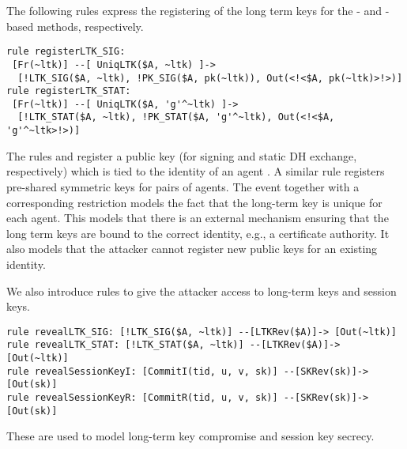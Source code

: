 The following rules express the registering of the long term keys for the
\mSig{}- and \mStat{}-based methods, respectively.
%
\begin{lstlisting}
rule registerLTK_SIG:
 [Fr(~ltk)] --[ UniqLTK($A, ~ltk) ]->
  [!LTK_SIG($A, ~ltk), !PK_SIG($A, pk(~ltk)), Out(<!<$A, pk(~ltk)>!>)]
rule registerLTK_STAT:
 [Fr(~ltk)] --[ UniqLTK($A, 'g'^~ltk) ]->
  [!LTK_STAT($A, ~ltk), !PK_STAT($A, 'g'^~ltk), Out(<!<$A, 'g'^~ltk>!>)]
\end{lstlisting}
%
The rules  and  register a public key
(for signing and static DH exchange, respectively) which is tied to the
identity of an agent .
%
A similar rule  registers pre-shared symmetric keys for
pairs of agents.
%
The event  together with a corresponding restriction models the fact that
the long-term key is unique for each agent.
This models that there is an external mechanism ensuring that the
long term keys are bound to the correct identity, e.g., a certificate authority.
%
It also models that the attacker cannot register new public keys for an
existing identity.
%

We also introduce rules to give the attacker access to
long-term keys and session keys.
%
\begin{lstlisting}
rule revealLTK_SIG: [!LTK_SIG($A, ~ltk)] --[LTKRev($A)]-> [Out(~ltk)]
rule revealLTK_STAT: [!LTK_STAT($A, ~ltk)] --[LTKRev($A)]-> [Out(~ltk)]
rule revealSessionKeyI: [CommitI(tid, u, v, sk)] --[SKRev(sk)]-> [Out(sk)]
rule revealSessionKeyR: [CommitR(tid, u, v, sk)] --[SKRev(sk)]-> [Out(sk)]
\end{lstlisting}
%
These are used to model long-term key compromise and session key secrecy.
\\

